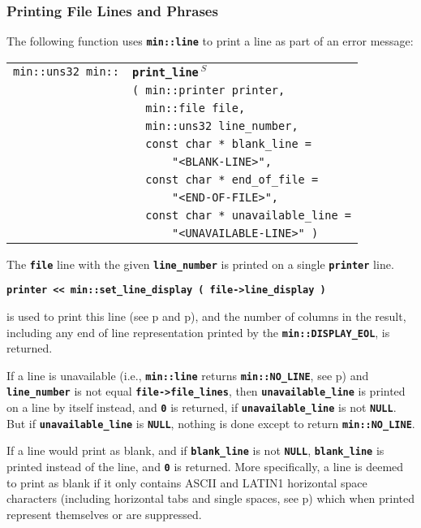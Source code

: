 \documentclass[12pt]{article}
\makeatletter
\newcommand{\TT}[1]{{\tt \bfseries #1}}
\newcommand{\ttindex}[1]{\index{#1@{\tt #1}}}
\newcommand{\pagref}[1]{p\pageref{#1}}
\newcommand{\EOL}{\penalty \exhyphenpenalty}
\newenvironment{indpar}[1][0.3in]%
	{\begin{list}{}%
		     {\setlength{\itemsep}{0in}%
		      \setlength{\topsep}{0in}%
		      \setlength{\parsep}{1ex}%
		      \setlength{\labelwidth}{#1}%
		      \setlength{\leftmargin}{#1}%
		      \addtolength{\leftmargin}{\labelsep}}%
	 \item}%
	{\end{list}}
\newcommand{\LABEL}[1]{\label{#1}}
\newlength{\ARGBREAKLENGTH}
\newcommand{\ARGBREAK}[1][\ARGBREAKLENGTH]{\\&\hspace*{#1}}
\newcommand{\MINKEY}[1]%
	   {\TT{#1}\ttindex{min::#1}\ttindex{#1}}
\newcommand{\RESIZE}{$\,^S$}
\makeatother
\begin{document}
\subsubsection{Printing File Lines and Phrases}
\label{PRINTING-FILE-LINES-AND-PHRASES}

The following function uses \TT{min::line} to print a line as part of
an error message:

\begin{indpar}[1em]\begin{tabular}{r@{}l}
\verb|min::uns32 min::|
    & \MINKEY{print\_\EOL line\RESIZE}\ARGBREAK
      \verb|( min::printer printer,|\ARGBREAK
      \verb|  min::file file,|\ARGBREAK
      \verb|  min::uns32 line_number,|\ARGBREAK
      \verb|  const char * blank_line =|\ARGBREAK
      \verb|      "<BLANK-LINE>",|\ARGBREAK
      \verb|  const char * end_of_file =|\ARGBREAK
      \verb|      "<END-OF-FILE>",|\ARGBREAK
      \verb|  const char * unavailable_line =|\ARGBREAK
      \verb|      "<UNAVAILABLE-LINE>" )|
\LABEL{MIN::PRINT_LINE} \\
\end{tabular}\end{indpar}

The \TT{file} line with the given \TT{line\_number}
is printed on a single \TT{printer} line.
\begin{center}
\TT{printer <{}< min::set\_line\_display ( file->line\_display )}
\end{center}
is used to print this line
(see \pagref{FILE_LINE_DISPLAY} and \pagref{MIN::SET_LINE_DISPLAY}),
and the number of columns in the result,
including any end of line representation printed by the
\TT{min::\EOL DISPLAY\_\EOL EOL}, is returned.

If a line is
unavailable (i.e., \TT{min::\EOL line} returns \TT{min::\EOL NO\_\EOL LINE},
see \pagref{MIN::LINE_OF_FILE})
and \TT{line\_\EOL number} is not equal \TT{file->\EOL file\_\EOL lines},
then \TT{unavailable\_\EOL line} is printed on a line by itself instead, and
\TT{0} is returned, if \TT{unavailable\_\EOL line} is not \TT{NULL}.
But if \TT{unavailable\_\EOL line} is \TT{NULL}, nothing is done except
to return \TT{min::\EOL NO\_\EOL LINE}.

If a line would print as blank, and if
\TT{blank\_\EOL line} is not \TT{NULL},
\TT{blank\_\EOL line} is printed instead of the line, and \TT{0} is returned.
More specifically, a line is deemed to print as blank if it only contains
ASCII and LATIN1 horizontal space characters (including horizontal tabs and
single spaces, see \pagref{MIN::IS_HSPACE})
which when printed represent themselves or are suppressed.
\end{document}
